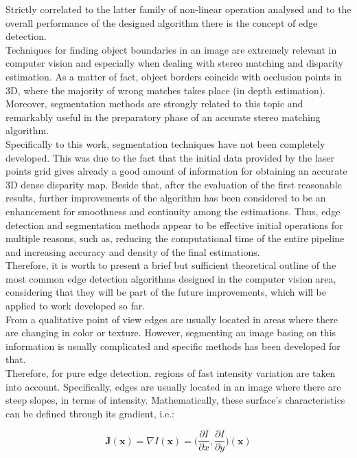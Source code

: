 Strictly correlated to the latter family of non-linear operation analysed and to the overall performance of the designed algorithm there is the concept of edge detection.\\
Techniques for finding object boundaries in an image are extremely relevant in computer vision and especially when dealing with stereo matching and disparity estimation. 
As a matter of fact, object borders coincide with occlusion points in 3D, where the majority of wrong matches takes place (in depth estimation). 
Moreover, segmentation methods are strongly related to this topic and remarkably useful in the preparatory phase of an accurate stereo matching algorithm.\\
Specifically to this work, segmentation techniques have not been completely developed.
This was due to the fact that the initial data provided by the laser points grid gives already a good amount of information for obtaining an accurate 3D dense disparity map.
Beside that, after the evaluation of the first reasonable results, further improvements of the algorithm has been considered to be an enhancement for smoothness and continuity among the estimations.
Thus, edge detection and segmentation methods appear to be effective initial operations for multiple reasons, such as, reducing the computational time of the entire pipeline and increasing accuracy and density of the final estimations.\\
Therefore, it is worth to present a brief but sufficient theoretical outline of the most common edge detection algorithms designed in the computer vision area, considering that they will be part of the future improvements, which will be applied to work developed so far. \\
From a qualitative point of view edges are usually located in areas where there are changing in color or texture.
However, segmenting an image basing on this information is usually complicated and specific methods has been developed for that.\\
Therefore, for pure edge detection, regions of fast intensity variation are taken into account.
Specifically, edges are usually located in an image where there are steep slopes, in terms of intensity.
Mathematically, these surface's characteristics can be defined through its gradient, i.e.:

\begin{equation}
	\label{eqn:gradient}
	\mathbf{J}(\mathbf{x}) = \nabla I(\mathbf{x}) = \Big( \frac{\partial I}{\partial x} , \frac{\partial I}{\partial y} \Big) (\mathbf{x})
\end{equation} 

